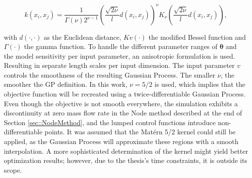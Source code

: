 \begin{equation}
k\left(x_i, x_j\right)=\frac{1}{\Gamma(\nu) 2^{\nu-1}}\left(\frac{\sqrt{2 \nu}}{l} d\left(x_i, x_j\right)\right)^\nu K_\nu\left(\frac{\sqrt{2 \nu}}{l} d\left(x_i, x_j\right)\right),
\end{equation}

with $d(\cdot,\cdot)$ as the Euclidean distance,  $Kv(\cdot)$ the modified Bessel function and $\Gamma (\cdot)$ the gamma function. To handle the different parameter ranges of $\boldsymbol{\theta}$ and the model sensitivity per input parameter, an anisotropic formulation is used. Resulting in separate length scales per input dimension. The input parameter $v$ controls the smoothness of the resulting Gaussian Process. The smaller $\nu$, the smoother the GP definition. In this work, $\nu = 5/2$ is used, which implies that the objective function will be recreated using a twice-differentiable Gaussian Process. Even though the objective is not smooth everywhere, the simulation exhibits a discontinuity at zero mass flow rate in the Node method described at the end of Section \ref{sec::NodeMethod}, and the lumped control functions introduce non-differentiable points. It was assumed that the Mat\'ern 5/2 kernel could still be applied, as the Gaussian Process will approximate these regions with a smooth interpolation. A more sophisticated determination of the kernel might yield better optimization results; however, due to the thesis's time constraints, it is outside its scope.


